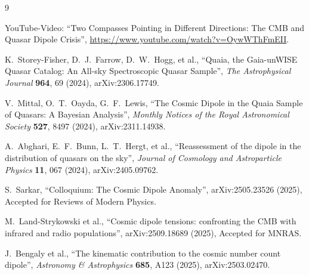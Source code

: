 	\begin{thebibliography}{9}
		
		YouTube-Video: ``Two Compasses Pointing in Different Directions: The CMB and Quasar Dipole Crisis'', 
		\url{https://www.youtube.com/watch?v=OywWThFmEII}.
		
		K.~Storey-Fisher, D.~J.~Farrow, D.~W.~Hogg, et al.,
		``Quaia, the Gaia-unWISE Quasar Catalog: An All-sky Spectroscopic Quasar Sample'',
		\emph{The Astrophysical Journal} \textbf{964}, 69 (2024),
		arXiv:2306.17749.
		
		V.~Mittal, O.~T.~Oayda, G.~F.~Lewis,
		``The Cosmic Dipole in the Quaia Sample of Quasars: A Bayesian Analysis'',
		\emph{Monthly Notices of the Royal Astronomical Society} \textbf{527}, 8497 (2024),
		arXiv:2311.14938.
		
		A.~Abghari, E.~F.~Bunn, L.~T.~Hergt, et al.,
		``Reassessment of the dipole in the distribution of quasars on the sky'',
		\emph{Journal of Cosmology and Astroparticle Physics} \textbf{11}, 067 (2024),
		arXiv:2405.09762.
		
		S.~Sarkar,
		``Colloquium: The Cosmic Dipole Anomaly'',
		arXiv:2505.23526 (2025),
		Accepted for Reviews of Modern Physics.
		
		M.~Land-Strykowski et al.,
		``Cosmic dipole tensions: confronting the CMB with infrared and radio populations'',
		arXiv:2509.18689 (2025),
		Accepted for MNRAS.
		
		J.~Bengaly et al.,
		``The kinematic contribution to the cosmic number count dipole'',
		\emph{Astronomy \& Astrophysics} \textbf{685}, A123 (2025),
		arXiv:2503.02470.
		
	\end{thebibliography}
